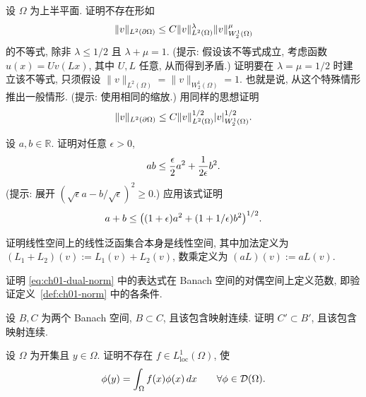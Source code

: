 \begin{MBExercise}
\label{ex:ch01-exercise-31}
设 $\Omega$ 为上半平面. 证明不存在形如
\[
\MathBookFormulaID{formula-ch01-exercise-31-impossible-scaling}
\|v\|_{L^2(\partial\Omega)}
\leq C\|v\|_{L^2(\Omega)}^\lambda
\|v\|_{W_2^1(\Omega)}^\mu
\]
的不等式, 除非 $\lambda\leq1/2$ 且 $\lambda+\mu=1$. (提示: 假设该不等式成立, 考虑函数 $u(x)=Uv(Lx)$, 其中 $U,L$ 任意, 从而得到矛盾.) 证明要在 $\lambda=\mu=1/2$ 时建立该不等式, 只须假设 $\|v\|_{L^2(\Omega)}=\|v\|_{W_2^1(\Omega)}=1$. 也就是说, 从这个特殊情形推出一般情形. (提示: 使用相同的缩放.) 用同样的思想证明
\[
\MathBookFormulaID{formula-ch01-exercise-31-seminorm-trace}
\|v\|_{L^2(\partial\Omega)}
\leq C\|v\|_{L^2(\Omega)}^{1/2}|v|_{W_2^1(\Omega)}^{1/2}.
\]
\end{MBExercise}

\begin{MBExercise}
\label{ex:ch01-exercise-32}
设 $a,b\in\mathbb R$. 证明对任意 $\epsilon>0$,
\[
\MathBookFormulaID{formula-ch01-exercise-32-young}
ab\leq\frac\epsilon2a^2+\frac1{2\epsilon}b^2.
\]
(提示: 展开 $(\sqrt\epsilon a-b/\sqrt\epsilon)^2\geq0$.) 应用该式证明
\[
\MathBookFormulaID{formula-ch01-exercise-32-two-term-bound}
a+b\leq\bigl((1+\epsilon)a^2+(1+1/\epsilon)b^2\bigr)^{1/2}.
\]
\end{MBExercise}

\begin{MBExercise}
\label{ex:ch01-exercise-33}
证明线性空间上的线性泛函集合本身是线性空间, 其中加法定义为 $(L_1+L_2)(v):=L_1(v)+L_2(v)$, 数乘定义为 $(aL)(v):=aL(v)$.
\end{MBExercise}

\begin{MBExercise}
\label{ex:ch01-exercise-34}
证明
\eqref{eq:ch01-dual-norm} 中的表达式在 Banach 空间的对偶空间上定义范数, 即验证定义~\ref{def:ch01-norm} 中的各条件.
\end{MBExercise}

\begin{MBExercise}
\label{ex:ch01-exercise-35}
设 $B,C$ 为两个 Banach 空间, $B\subset C$, 且该包含映射连续. 证明 $C'\subset B'$, 且该包含映射连续.
\end{MBExercise}

\begin{MBExercise}
\label{ex:ch01-exercise-36}
设 $\Omega$ 为开集且 $y\in\Omega$. 证明不存在 $f\in L_{\mathrm{loc}}^1(\Omega)$, 使
\[
\MathBookFormulaID{formula-ch01-exercise-36-no-dirac-density}
\phi(y)=\int_\Omega f(x)\phi(x)\,dx
\qquad\forall\phi\in\mathcal D(\Omega).
\]
\end{MBExercise}

